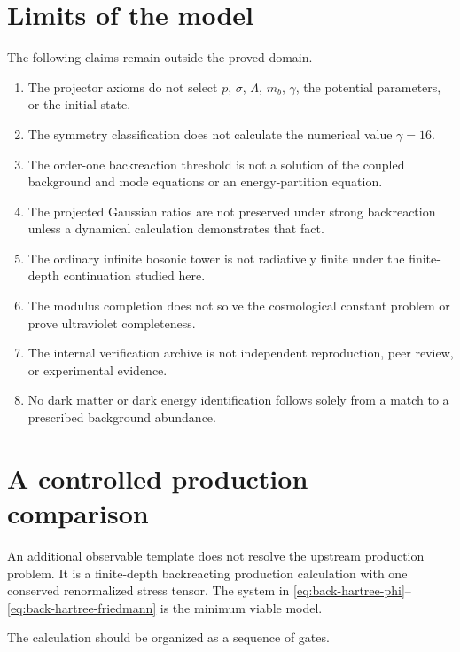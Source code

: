 \section{Limits of the model}

The following claims remain outside the proved domain.
\begin{enumerate}[leftmargin=2.2em]
\item The projector axioms do not select \(p\), \(\sigma\), \(\Lambda\), \(m_b\), \(\gamma\), the potential parameters, or the initial state.
\item The symmetry classification does not calculate the numerical value \(\gamma=16\).
\item The order-one backreaction threshold is not a solution of the coupled background and mode equations or an energy-partition equation.
\item The projected Gaussian ratios are not preserved under strong backreaction unless a dynamical calculation demonstrates that fact.
\item The ordinary infinite bosonic tower is not radiatively finite under the finite-depth continuation studied here.
\item The modulus completion does not solve the cosmological constant problem or prove ultraviolet completeness.
\item The internal verification archive is not independent reproduction, peer review, or experimental evidence.
\item No dark matter or dark energy identification follows solely from a match to a prescribed background abundance.
\end{enumerate}

\section{A controlled production comparison}

An additional observable template does not resolve the upstream production problem.  It is a finite-depth backreacting production calculation with one conserved renormalized stress tensor.  The system in \eqref{eq:back-hartree-phi}--\eqref{eq:back-hartree-friedmann} is the minimum viable model.

The calculation should be organized as a sequence of gates.

